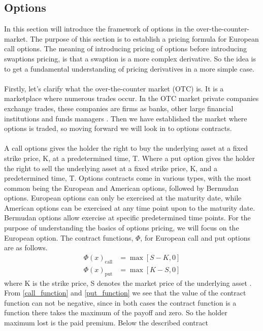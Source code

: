 \subsection{Options}
In this section will introduce the framework of options in the over-the-counter-market. 
The purpose of this section is to establish a pricing formula for European call options.
The meaning of introducing pricing of options before introducing swaptions pricing, is that a swaption is  a 
more complex derivative. So the idea is to get a fundamental understanding of pricing derivatives in a more simple case.
\\\\
Firstly, let's clarify what the over-the-counter market (OTC) is. It is  a marketplace where numerous trades occur.
In the OTC market private companies exchange trades, these companies are firms as banks, other 
large financial institutions and funds managers \cite{Hull}. Then we have established the market where 
options is traded, so moving forward we will look in to options contracts. 
\\\\
A call options gives the holder the right to buy the underlying asset at a fixed strike price, K, at a 
predetermined time, T. Where a put option gives the holder the right to sell the underlying asset at a fixed
strike price, K, and a predetermined time, T. Options contracts come in various types, with the 
most common being the European and American options, followed by Bermudan options. European options can only 
be exercised at the maturity date, while American options can be exercised at any time point upon to the maturity date.
Bermudan options allow exercise at specific predetermined time points.
For the purpose of understanding the basics of options pricing, we will focus on the European option. 
The contract functions, $\Phi$, for European call and put options are as follows.
\begin{align}
    \Phi(x)_{\text{call}} &=  \max[S-K,0] \label{call_function}\\ 
    \Phi(x)_{\text{put}} &= \max [K-S,0] \label{put_function}
\end{align}
where K is the strike price, S denotes the market price of the underlying asset \cite{Bjork}. From \autoref{call_function} and \autoref{put_function} we see
that the value of the contract function can not be negative, since in both cases the contract function is a 
function there takes the maximum of the payoff and zero. So the holder maximum lost is the paid premium. Below the described contract
